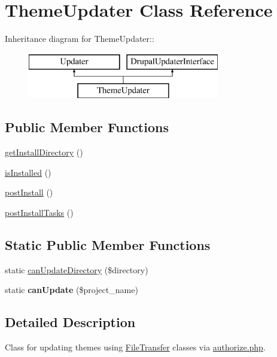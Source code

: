 \hypertarget{classThemeUpdater}{
\section{ThemeUpdater Class Reference}
\label{classThemeUpdater}
}
Inheritance diagram for ThemeUpdater::\begin{figure}[H]
\begin{center}
\leavevmode
\includegraphics[height=2cm]{classThemeUpdater}
\end{center}
\end{figure}
\subsection*{Public Member Functions}
\begin{DoxyCompactItemize}
\item 
\hyperlink{classThemeUpdater_a3c3305b406350c7e0c9cca377e5b50d6}{getInstallDirectory} ()
\item 
\hyperlink{classThemeUpdater_aa150c0bf1bc488f7cc32f681eb7ff4b6}{isInstalled} ()
\item 
\hyperlink{classThemeUpdater_a66e74f3e7f7116e77355947e11d038e1}{postInstall} ()
\item 
\hyperlink{classThemeUpdater_a0ed994865cfa41230a515aa3d759e693}{postInstallTasks} ()
\end{DoxyCompactItemize}
\subsection*{Static Public Member Functions}
\begin{DoxyCompactItemize}
\item 
static \hyperlink{classThemeUpdater_a5a7a2a58d90d97545d32a41af99a6afc}{canUpdateDirectory} (\$directory)
\item 
\hypertarget{classThemeUpdater_a7b852de833a0393055cb74df26c77899}{
static {\bfseries canUpdate} (\$project\_\-name)}
\label{classThemeUpdater_a7b852de833a0393055cb74df26c77899}

\end{DoxyCompactItemize}


\subsection{Detailed Description}
Class for updating themes using \hyperlink{classFileTransfer}{FileTransfer} classes via \hyperlink{authorize_8php}{authorize.php}. 

